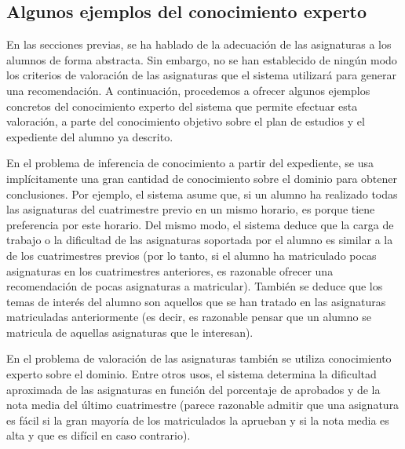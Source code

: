 
\subsection{Algunos ejemplos del conocimiento experto} \label{sec:ejemplos}

En las secciones previas, se ha hablado de la adecuación de las asignaturas a 
los alumnos de forma abstracta. Sin embargo, no se han establecido de ningún 
modo los criterios de valoración de las asignaturas que el sistema utilizará 
para generar una recomendación. A continuación, procedemos a ofrecer algunos 
ejemplos concretos del conocimiento experto del sistema que permite efectuar 
esta valoración, a parte del conocimiento objetivo sobre el plan de estudios 
y el expediente del alumno ya descrito.

En el problema de inferencia de conocimiento a partir del expediente, se usa 
implícitamente una gran cantidad de conocimiento sobre el dominio para obtener 
conclusiones. Por ejemplo, el sistema asume que, si un alumno ha realizado 
todas las asignaturas del cuatrimestre previo en un mismo horario, es porque 
tiene preferencia por este horario. Del mismo modo, el sistema deduce que la 
carga de trabajo o la dificultad de las asignaturas soportada por el alumno 
es similar a la de los cuatrimestres previos (por lo tanto, si el alumno ha 
matriculado pocas asignaturas en los cuatrimestres anteriores, es razonable 
ofrecer una recomendación de pocas asignaturas a matricular). También se 
deduce que los temas de interés del alumno son aquellos que se han tratado en 
las asignaturas matriculadas anteriormente (es decir, es razonable pensar que 
un alumno se matricula de aquellas asignaturas que le interesan).

En el problema de valoración de las asignaturas también se utiliza 
conocimiento experto sobre el dominio. Entre otros usos, el sistema determina 
la dificultad aproximada de las asignaturas en función del porcentaje de 
aprobados y de la nota media del último cuatrimestre (parece razonable admitir 
que una asignatura es fácil si la gran mayoría de los matriculados la aprueban 
y si la nota media es alta y que es difícil en caso contrario). 



